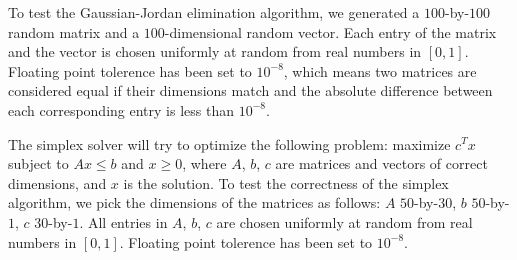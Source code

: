 To test the Gaussian-Jordan elimination algorithm, we generated a $100$-by-$100$ random matrix and a $100$-dimensional random vector.
Each entry of the matrix and the vector is chosen uniformly at random from real numbers in $[0,1]$.
Floating point tolerence has been set to $10^{-8}$, which means two matrices are considered equal if their dimensions match and the absolute difference between each corresponding entry is less than $10^{-8}$.

The simplex solver will try to optimize the following problem: maximize $c^T x$ subject to $Ax \leq b$ and $x \geq 0$, where $A$, $b$, $c$ are matrices and vectors of correct dimensions, and $x$ is the solution.
To test the correctness of the simplex algorithm, we pick the dimensions of the matrices as follows: $A$ $50$-by-$30$, $b$ $50$-by-$1$, $c$ $30$-by-$1$.
All entries in $A$, $b$, $c$ are chosen uniformly at random from real numbers in $[0,1]$.
Floating point tolerence has been set to $10^{-8}$.

% 

